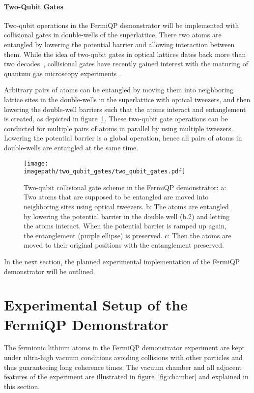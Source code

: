\paragraph*{Two-Qubit Gates}
Two-qubit operations in the FermiQP demonstrator will be implemented with collisional gates in double-wells of the superlattice. There two atoms are entangled by lowering the potential barrier and allowing interaction between them. While the idea of two-qubit gates in optical lattices dates back more than two decades~\cite{jaksch_fast_2000, anderlini_controlled_2006,trotzky_time-resolved_2008}, collisional gates have recently gained interest with the maturing of quantum gas microscopy experiments~\cite{dai_generation_2016, yang_cooling_2020, zhang_functional_2022}.

Arbitrary pairs of atoms can be entangled by moving them into neighboring lattice sites in the double-wells in the superlattice with optical tweezers, and then lowering the double-well barriers such that the atoms interact and entanglement is created, as depicted in figure~\ref{fig:two_qubit_gates}. These two-qubit gate operations can be conducted for multiple pairs of atoms in parallel by using multiple tweezers. Lowering the potential barrier is a global operation, hence all pairs of atoms in double-wells are entangled at the same time.

\begin{figure}
    \centering
    \texttt{[image: \\imagepath/two\_qubit\_gates/two\_qubit\_gates.pdf]}
    \caption{Two-qubit collisional gate scheme in the FermiQP demonstrator: a: Two atoms that are supposed to be entangled are moved into neighboring sites using optical tweezers. b: The atoms are entangled by lowering the potential barrier in the double well (b.2) and letting the atoms interact. When the potential barrier is ramped up again, the entanglement (purple ellipse) is preserved. c: Then the atoms are moved to their original positions with the entanglement preserved.}
    \label{fig:two_qubit_gates}
\end{figure}

In the next section, the planned experimental implementation of the FermiQP demonstrator will be outlined.



\section{Experimental Setup of the FermiQP Demonstrator}
The fermionic lithium atoms in the FermiQP demonstrator experiment are kept under ultra-high vacuum conditions avoiding collisions with other particles and thus guaranteeing long coherence times. The vacuum chamber and all adjacent features of the experiment are illustrated in figure~\ref{fig:chamber} and explained in this section.

